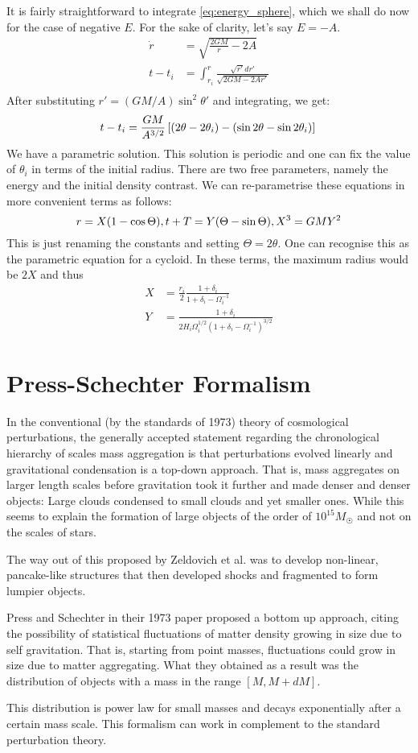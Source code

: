 \documentclass[12pt,a4paper,oneside]{book}
\begin{document}
		It is fairly straightforward to integrate \ref{eq:energy_sphere}, which we shall do now for the case of negative $E$. For the sake of clarity, let's say $E=-A$.
		$$
		\begin{aligned}
			\dot{r}&=\sqrt{\frac{2GM}{r}-2A}\\
			t-t_i&=\int_{r_i}^{r}\frac{\sqrt{r'}dr'}{\sqrt{2GM-2Ar'}}\\
		\end{aligned}
		$$
		After substituting $r'=(GM/A)\sin^2\theta'$ and integrating, we get:
		$$
			t-t_i=\frac{GM}{A^{3/2}}\left[(2\theta-2\theta_i)-(\sin2\theta-\sin2\theta_i)\right]\\
		$$
		We have a parametric solution. This solution is periodic and one can fix the value of $\theta_i$ in terms of the initial radius. There are two free parameters, namely the energy and the initial density contrast. We can re-parametrise these equations in more convenient terms as follows:
		$$
			r=X(1-\cos\Theta),t+T=Y(\Theta-\sin\Theta),X^3=GMY^2\\
		$$
		This is just renaming the constants and setting $\Theta=2\theta$. One can recognise this as the parametric equation for a cycloid. In these terms, the maximum radius would be $2X$ and thus 
		$$
		\begin{aligned}
			X&=\frac{r_i}{2}\frac{1+\delta_i}{1+\delta_i-\Omega_i^{-1}}\\
			Y&=\frac{1+\delta_i}{2H_i\Omega_i^{1/2}	(1+\delta_i-\Omega_i^{-1})^{3/2}}
		\end{aligned}
		$$
	\section{Press-Schechter Formalism}
		In the conventional (by the standards of 1973) theory of cosmological perturbations,	the generally accepted statement regarding the chronological hierarchy of scales mass aggregation is that perturbations evolved linearly and gravitational condensation is a top-down approach. That is, mass aggregates on larger length scales before gravitation took it further and made denser and denser objects: Large clouds condensed to small clouds and yet smaller ones. While this seems to explain the formation of large objects of the order of $10^{15}M_\Sun$ and not on the scales of stars.
		
		The way out of this proposed by Zeldovich et al. was to develop non-linear, pancake-like structures that then developed shocks and fragmented to form lumpier objects.
		
		Press and Schechter in their 1973 paper proposed a bottom up approach, citing the possibility of statistical fluctuations of matter density growing in size due to self gravitation. That is, starting from point masses, fluctuations could grow in size due to matter aggregating. What they obtained as a result was the distribution of objects with a mass in the range $[M, M+dM]$. 
		
		This distribution is power law for small masses and decays exponentially after a certain mass scale. This formalism can work in complement to the standard perturbation theory.
\end{document}
